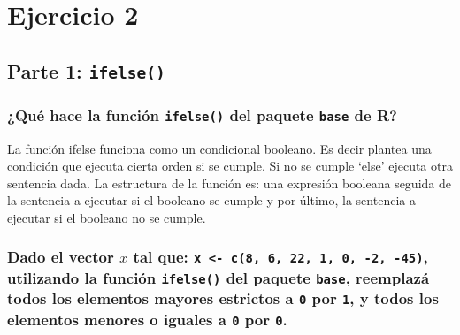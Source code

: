 \documentclass[
]{article}
\begin{document}
\hypertarget{ejercicio-2}{%
\section{Ejercicio 2}\label{ejercicio-2}}

\hypertarget{parte-1-ifelse}{%
\subsection{\texorpdfstring{Parte 1:
\texttt{ifelse()}}{Parte 1: ifelse()}}\label{parte-1-ifelse}}

\hypertarget{quuxe9-hace-la-funciuxf3n-ifelse-del-paquete-base-de-r}{%
\subsubsection{\texorpdfstring{¿Qué hace la función \texttt{ifelse()}
del paquete \texttt{base} de
R?}{¿Qué hace la función ifelse() del paquete base de R?}}\label{quuxe9-hace-la-funciuxf3n-ifelse-del-paquete-base-de-r}}

La función ifelse funciona como un condicional booleano. Es decir
plantea una condición que ejecuta cierta orden si se cumple. Si no se
cumple `else' ejecuta otra sentencia dada. La estructura de la función
es: una expresión booleana seguida de la sentencia a ejecutar si el
booleano se cumple y por último, la sentencia a ejecutar si el booleano
no se cumple.

\hypertarget{dado-el-vector-x-tal-que-x---c8-6-22-1-0--2--45-utilizando-la-funciuxf3n-ifelse-del-paquete-base-reemplazuxe1-todos-los-elementos-mayores-estrictos-a-0-por-1-y-todos-los-elementos-menores-o-iguales-a-0-por-0.}{%
\subsubsection{\texorpdfstring{Dado el vector \(x\) tal que:
\texttt{x\ \textless{}-\ c(8,\ 6,\ 22,\ 1,\ 0,\ -2,\ -45)}, utilizando
la función \texttt{ifelse()} del paquete \texttt{base}, reemplazá todos
los elementos mayores estrictos a \texttt{0} por \texttt{1}, y todos los
elementos menores o iguales a \texttt{0} por
\texttt{0}.}{Dado el vector x tal que: x \textless- c(8, 6, 22, 1, 0, -2, -45), utilizando la función ifelse() del paquete base, reemplazá todos los elementos mayores estrictos a 0 por 1, y todos los elementos menores o iguales a 0 por 0.}}\label{dado-el-vector-x-tal-que-x---c8-6-22-1-0--2--45-utilizando-la-funciuxf3n-ifelse-del-paquete-base-reemplazuxe1-todos-los-elementos-mayores-estrictos-a-0-por-1-y-todos-los-elementos-menores-o-iguales-a-0-por-0.}}
\end{document}
